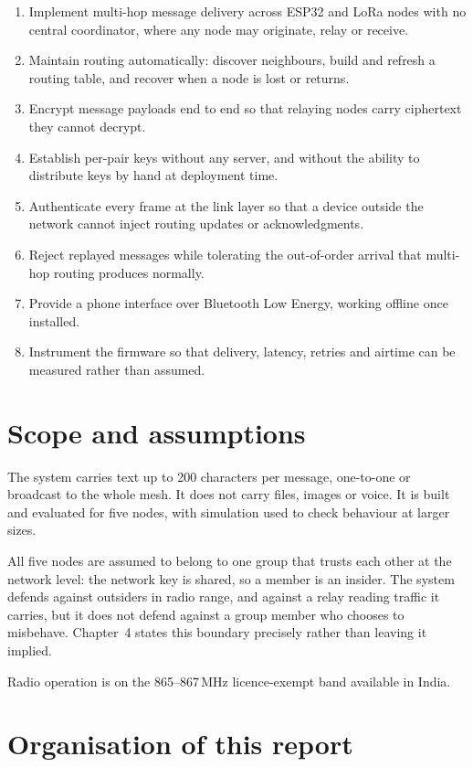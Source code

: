 \documentclass[12pt,a4paper,oneside]{report}
\begin{document}
\begin{enumerate}
\item Implement multi-hop message delivery across ESP32 and LoRa nodes with no
      central coordinator, where any node may originate, relay or receive.
\item Maintain routing automatically: discover neighbours, build and refresh a
      routing table, and recover when a node is lost or returns.
\item Encrypt message payloads end to end so that relaying nodes carry
      ciphertext they cannot decrypt.
\item Establish per-pair keys without any server, and without the ability to
      distribute keys by hand at deployment time.
\item Authenticate every frame at the link layer so that a device outside the
      network cannot inject routing updates or acknowledgments.
\item Reject replayed messages while tolerating the out-of-order arrival that
      multi-hop routing produces normally.
\item Provide a phone interface over Bluetooth Low Energy, working offline once
      installed.
\item Instrument the firmware so that delivery, latency, retries and airtime can
      be measured rather than assumed.
\end{enumerate}

\section{Scope and assumptions}

The system carries text up to 200 characters per message, one-to-one or
broadcast to the whole mesh. It does not carry files, images or voice. It is
built and evaluated for five nodes, with simulation used to check behaviour at
larger sizes.

All five nodes are assumed to belong to one group that trusts each other at the
network level: the network key is shared, so a member is an insider. The system
defends against outsiders in radio range, and against a relay reading traffic it
carries, but it does not defend against a group member who chooses to misbehave.
Chapter~4 states this boundary precisely rather than leaving it implied.

Radio operation is on the 865--867\,MHz licence-exempt band available in India.

\section{Organisation of this report}
\end{document}
